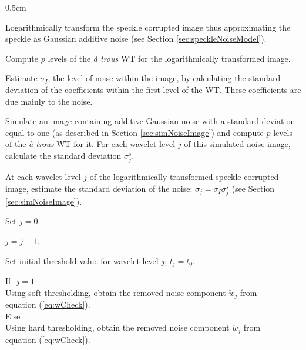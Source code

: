\documentclass[12pt]{report}
\renewcommand{\baselinestretch}{1.5}
\begin{document}
\small
\begin{list}{.}{ 
\renewcommand{\baselinestretch}{1}
\setlength{\labelwidth} {0.5cm} \rm }
	\item Logarithmically transform the speckle corrupted image thus
	approximating the speckle as Gaussian additive noise (see Section \ref{sec:speckleNoiseModel}).
		
	\item Compute $p$ levels of the \emph{\`a trous} WT for the logarithmically
	transformed image. 

	\item Estimate $\sigma_{I}$, the level of noise within the image, by calculating the standard deviation 
	of the coefficients within the
	first level of the WT. These coefficients are due mainly to the noise.
	
	\item Simulate an image containing additive Gaussian noise with a standard deviation equal to one
	(as described in Section \ref{sec:simNoiseImage})
	and compute $p$ levels of the \emph{\`a trous} WT for it. 
	For each wavelet level $j$ of this simulated noise image, calculate the standard deviation $\sigma_{j}^{s}$.

	\item At each wavelet level $j$ of the logarithmically transformed speckle corrupted image, 
	estimate the standard deviation of the noise: $\sigma_{j}=\sigma_{I}\sigma_{j}^{s}$ (see Section \ref{sec:simNoiseImage}). 
	
	\item Set $j=0$.
	
	\item $j=j+1$.
	\label{step:incrementJ}

	\item Set initial threshold value for wavelet level $j$; $t_{j} = t_{0}$. 

	\item 
	\begin{tabbing}
	If \= $j = 1$ \\
	\>Using soft thresholding, obtain the removed noise component $\check{w}_{j}$ from \\ \>equation (\ref{eq:wCheck}). \\ 
	Else \\
	\>Using hard thresholding, obtain the removed noise component $\check{w}_{j}$ from \\ \>equation (\ref{eq:wCheck}).
	\end{tabbing}
	\label{step:sh_if1}


\end{list}
\end{document}

